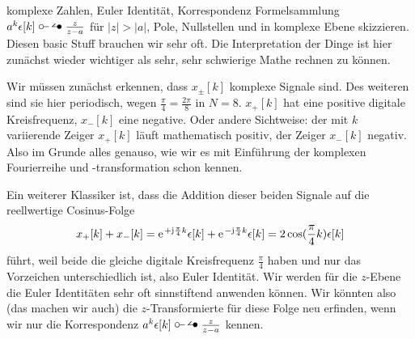 \begin{Werkzeug}
komplexe Zahlen, Euler Identität,
Korrespondenz Formelsammlung $a^k \epsilon[k] \ztransf \frac{z}{z-a}$ für $|z|>|a|$,
Pole, Nullstellen und in komplexe Ebene skizzieren. Diesen basic Stuff brauchen wir
sehr oft. Die Interpretation der Dinge ist hier zunächst wieder wichtiger
als sehr, sehr schwierige Mathe rechnen zu können.
\end{Werkzeug}
\begin{Ansatz}
Wir müssen zunächst erkennen, dass $x_\pm[k]$ komplexe Signale sind. Des weiteren
sind sie hier periodisch, wegen $\frac{\pi}{4}=\frac{2\pi}{8}$ in $N=8$.
$x_+[k]$ hat eine positive digitale Kreisfrequenz, $x_-[k]$ eine negative. Oder
andere Sichtweise: der mit $k$ variierende Zeiger $x_+[k]$ läuft mathematisch
positiv, der Zeiger $x_-[k]$ negativ. Also im Grunde alles genauso, wie wir
es mit Einführung der komplexen Fourierreihe und -transformation schon kennen.

Ein weiterer Klassiker ist, dass die Addition dieser beiden Signale auf
die reellwertige Cosinus-Folge
\begin{align}
x_+[k] + x_-[k]=
\e^{+\im\frac{\pi}{4} k} \epsilon[k] + \e^{-\im\frac{\pi}{4} k} \epsilon[k]
= 2 \cos(\frac{\pi}{4} k) \epsilon[k]
\end{align}
führt, weil beide die gleiche digitale Kreisfrequenz $\frac{\pi}{4}$ haben und
nur das Vorzeichen unterschiedlich ist, also Euler Identität.
%
Wir werden für die $z$-Ebene die Euler Identitäten sehr oft sinnstiftend
anwenden können.
%
Wir könnten also (das machen wir auch) die $z$-Transformierte für diese Folge neu
erfinden, wenn wir nur die Korrespondenz $a^k \epsilon[k] \ztransf \frac{z}{z-a}$
kennen.
\end{Ansatz}
